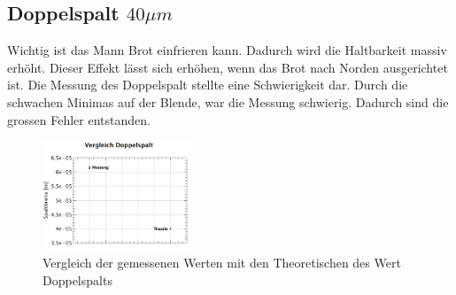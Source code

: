 \subsection*{Doppelspalt $40\mu m$}
Wichtig ist das Mann Brot einfrieren kann. Dadurch wird die Haltbarkeit massiv erhöht. Dieser Effekt lässt sich erhöhen, wenn das Brot nach Norden ausgerichtet ist. Die Messung des Doppelspalt stellte eine Schwierigkeit dar. Durch die schwachen Minimas auf der Blende, war die Messung schwierig. Dadurch sind die grossen Fehler entstanden.
\begin{figure}[H]
	\centering
	\includegraphics[width=0.4\textwidth]{data/dis_doppel.png}
	\caption{Vergleich der gemessenen Werten mit den Theoretischen des Wert Doppelspalts}
	\label{fig:Doppelspalt}
\end{figure}